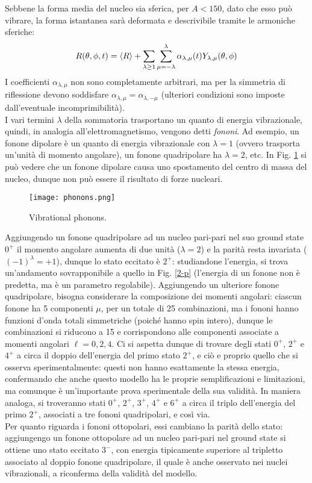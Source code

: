 Sebbene la forma media del nucleo sia sferica, per $ A < 150 $, dato che esso può vibrare, la forma istantanea sarà deformata e descrivibile tramite le armoniche sferiche:
\begin{equation}
	R(\theta,\phi,t) = \braket{R} + \sum_{\lambda \ge 1} \sum_{\mu = -\lambda}^{\lambda} \alpha_{\lambda,\mu}(t) Y_{\lambda,\mu}(\theta,\phi)
	\label{eq:5.11}
\end{equation}
I coefficienti $ \alpha_{\lambda,\mu} $ non sono completamente arbitrari, ma per la simmetria di riflessione devono soddisfare $ \alpha_{\lambda,\mu} = \alpha_{\lambda,-\mu} $ (ulteriori condizioni sono imposte dall'eventuale incomprimibilità).\\
I vari termini $ \lambda $ della sommatoria trasportano un quanto di energia vibrazionale, quindi, in analogia all'elettromagnetismo, vengono detti \textit{fononi}. Ad esempio, un fonone dipolare è un quanto di energia vibrazionale con $ \lambda = 1 $ (ovvero trasporta un'unità di momento angolare), un fonone quadripolare ha $ \lambda = 2 $, etc. In Fig. \ref{phon} si può vedere che un fonone dipolare causa uno spostamento del centro di massa del nucleo, dunque non può essere il risultato di forze nucleari.

\begin{figure}[!t]
	\centering
	\texttt{[image: phonons.png]}
	\caption{Vibrational phonons.}
	\label{phon}
\end{figure}

Aggiungendo un fonone quadripolare ad un nucleo pari-pari nel suo ground state $ 0^+ $ il momento angolare aumenta di due unità ($ \lambda = 2 $) e la parità resta invariata ($ (-1)^{\lambda} = +1 $), dunque lo stato eccitato è $ 2^+ $: studiandone l'energia, si trova un'andamento sovrapponibile a quello in Fig. \ref{2-p} (l'energia di un fonone non è predetta, ma è un parametro regolabile). Aggiungendo un ulteriore fonone quadripolare, bisogna considerare la composizione dei momenti angolari: ciascun fonone ha 5 componenti $ \mu $, per un totale di 25 combinazioni, ma i fononi hanno funzioni d'onda totali simmetriche (poiché hanno spin intero), dunque le combinazioni si riducono a 15 e corrispondono alle componenti associate a momenti angolari $ \ell = 0,2,4 $. Ci si aspetta dunque di trovare degli stati $ 0^+ $, $ 2^+ $ e $ 4^+ $ a circa il doppio dell'energia del primo stato $ 2^+ $, e ciò e proprio quello che si osserva sperimentalmente: questi non hanno esattamente la stessa energia, confermando che anche questo modello ha le proprie semplificazioni e limitazioni, ma comunque è un'importante prova sperimentale della sua validità. In maniera analoga, si troveranno stati $ 0^+ $, $ 2^+ $, $ 3^+ $, $ 4^+ $ e $ 6^+ $ a circa il triplo dell'energia del primo $ 2^+ $, associati a tre fononi quadripolari, e così via.\\
Per quanto riguarda i fononi ottopolari, essi cambiano la parità dello stato: aggiungengo un fonone ottopolare ad un nucleo pari-pari nel ground state si ottiene uno stato eccitato $ 3^- $, con energia tipicamente superiore al tripletto associato al doppio fonone quadripolare, il quale è anche osservato nei nuclei vibrazionali, a riconferma della validità del modello.


